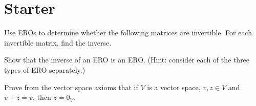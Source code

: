 \documentclass[answers]{exam}
\newcommand*{\bump}{\vspace{1em}\phantom{}\vspace{-1.75em}}
\begin{document}
\section*{Starter}
\begin{questions}

\question%
Use EROs to determine whether the following matrices are invertible. For each invertible matrix, find the inverse.
\begin{parts}
\part%
\bump \[
	\begin{pmatrix}
		1 & 2 \\
		3 & 4
	\end{pmatrix};
\]

\part%
\bump \[
	\begin{pmatrix}
		1 & 2 & 3 \\
		-1 & 0 & 1 \\
		2 & 4 & 6
	\end{pmatrix};
\]

\part%
\bump \[
	\begin{pmatrix}
		-2 & 0 & 4 & 3 \\
		1 & 7 & 5 & -6 \\
		-3 & 7 & 13 & 0 \\
		0 & 1 & 2 & 3
	\end{pmatrix}.
\]
\end{parts}



\question%
Show that the inverse of an ERO is an ERO. (Hint: consider each of the three types of ERO separately.)



\question%
Prove from the vector space axioms that if $V$ is a vector space, $v, z \in V$ and $v+z=v$, then $z=0_{V}$.

\end{questions}
\end{document}
